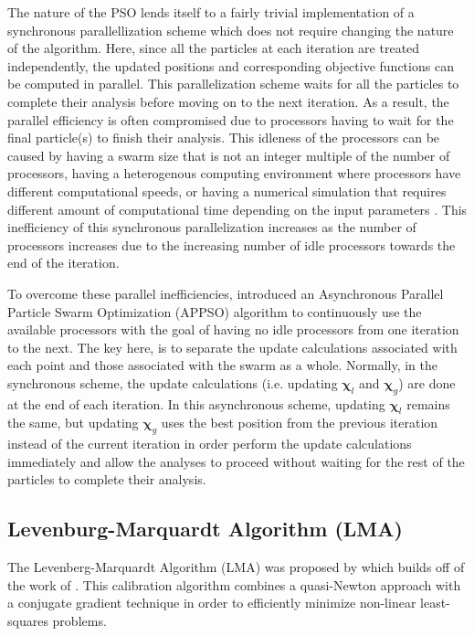 The nature of the PSO lends itself to a fairly trivial implementation of a synchronous parallellization scheme which does not require changing the nature of the algorithm. Here, since all the particles at each iteration are treated independently, the updated positions and corresponding objective functions can be computed in parallel. This parallelization scheme waits for all the particles to complete their analysis before moving on to the next iteration. As a result, the parallel efficiency is often compromised due to processors having to wait for the final particle(s) to finish their analysis. This idleness of the processors can be caused by having a swarm size that is not an integer multiple of the number of processors, having a heterogenous computing environment where processors have different computational speeds, or having a numerical simulation that requires different amount of computational time depending on the input parameters \citep{Venter_2006}. This inefficiency of this synchronous parallelization increases as the number of processors increases due to the increasing number of idle processors towards the end of the iteration.

To overcome these parallel inefficiencies, \citet{Venter_2006} introduced an Asynchronous Parallel Particle Swarm Optimization (APPSO) algorithm to continuously use the available processors with the goal of having no idle processors from one iteration to the next. The key here, is to separate the update calculations associated with each point and those associated with the swarm as a whole. Normally, in the synchronous scheme, the update calculations (i.e. updating $\boldsymbol{\chi}_l$ and $\boldsymbol{\chi}_g$) are done at the end of each iteration. In this asynchronous scheme, updating $\boldsymbol{\chi}_l$ remains the same, but updating $\boldsymbol{\chi}_g$ uses the best position from the previous iteration instead of the current iteration in order perform the update calculations immediately and allow the analyses to proceed without waiting for the rest of the particles to complete their analysis.

\subsection{Levenburg-Marquardt Algorithm (LMA)}

The Levenberg-Marquardt Algorithm (LMA) was proposed by \citet{marquardt_algorithm_1963} which builds off of the work of \citet{levenberg_method_1944}. This calibration algorithm combines a quasi-Newton approach with a conjugate gradient technique in order to efficiently minimize non-linear least-squares problems. 

